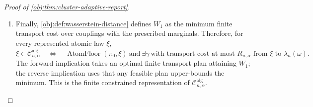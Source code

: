 \documentclass[11pt]{article}
\begin{document}
\begin{proof}[Proof of \cref{obj:thm:cluster-adaptive-report}]
\begin{enumerate}
\item Finally, \cref{obj:def:wasserstein-distance} defines \(W_1\) as the
minimum finite transport cost over couplings with the prescribed marginals.
Therefore, for every represented atomic law \(\xi\),
\[
\xi\in\mathcal C^{\mathrm{alg}}_{n,\alpha}
\quad\Longleftrightarrow\quad
\operatorname{AtomFloor}(\pi_0,\xi)
\ \text{and}\
\exists\gamma\ \text{with transport cost at most }R_{n,\alpha}
\text{ from }\xi\text{ to }\widehat\lambda_n(\omega).
\]
The forward implication takes an optimal finite transport plan attaining
\(W_1\); the reverse implication uses that any feasible plan upper-bounds the
minimum.  This is the finite constrained representation of
\(\mathcal C^{\mathrm{alg}}_{n,\alpha}\). %
\end{enumerate}
\end{proof}
\end{document}
